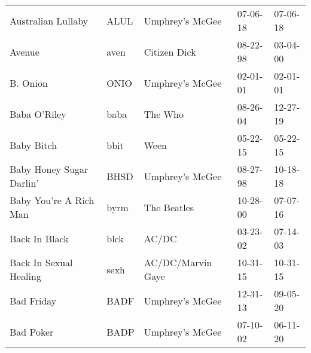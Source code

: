 \begin{longtable}{p{}p{}p{}p{}p{}}
                                                      Australian Lullaby &          ALUL &                                          Umphrey's McGee &              07-06-18 &             07-06-18 \\
                                                                  Avenue &          aven &                                             Citizen Dick &              08-22-98 &             03-04-00 \\
                                                                B. Onion &          ONIO &                                          Umphrey's McGee &              02-01-01 &             02-01-01 \\
                                                            Baba O'Riley &          baba &                                                  The Who &              08-26-04 &             12-27-19 \\
                                                              Baby Bitch &          bbit &                                                     Ween &              05-22-15 &             05-22-15 \\
                                                Baby Honey Sugar Darlin' &          BHSD &                                          Umphrey's McGee &              08-27-98 &             10-18-18 \\
                                                  Baby You're A Rich Man &          byrm &                                              The Beatles &              10-28-00 &             07-07-16 \\
                                                           Back In Black &          blck &                                                    AC/DC &              03-23-02 &             07-14-03 \\
                                                  Back In Sexual Healing &          sexh &                                        AC/DC/Marvin Gaye &              10-31-15 &             10-31-15 \\
                                                              Bad Friday &          BADF &                                          Umphrey's McGee &              12-31-13 &             09-05-20 \\
                                                               Bad Poker &          BADP &                                          Umphrey's McGee &              07-10-02 &             06-11-20 \\

\end{longtable}
